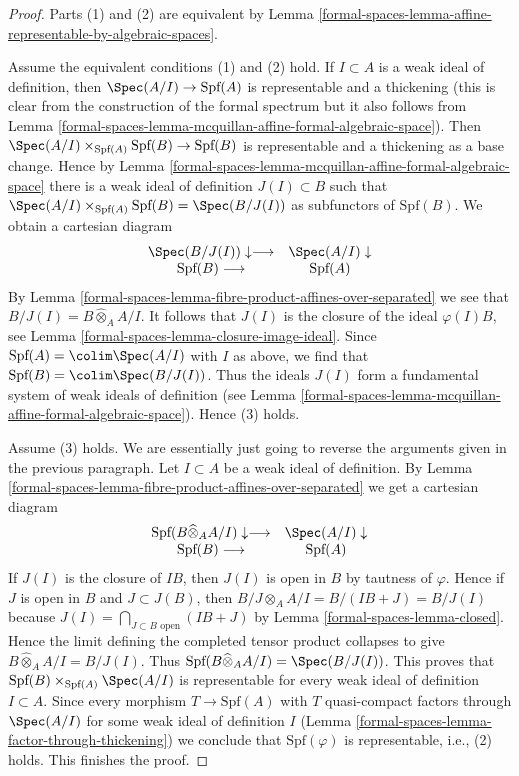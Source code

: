 \begin{proof}
Parts (1) and (2) are equivalent by
Lemma \ref{formal-spaces-lemma-affine-representable-by-algebraic-spaces}.

\medskip\noindent
Assume the equivalent conditions (1) and (2) hold.
If $I \subset A$ is a weak ideal of definition, then
$\Spec(A/I) \to \text{Spf}(A)$ is representable and a thickening
(this is clear from the construction of the formal spectrum
but it also follows from
Lemma \ref{formal-spaces-lemma-mcquillan-affine-formal-algebraic-space}).
Then $\Spec(A/I) \times_{\text{Spf}(A)} \text{Spf}(B) \to \text{Spf}(B)$
is representable and a thickening as a base change.
Hence by
Lemma \ref{formal-spaces-lemma-mcquillan-affine-formal-algebraic-space}
there is a weak ideal of definition $J(I) \subset B$ such that
$\Spec(A/I) \times_{\text{Spf}(A)} \text{Spf}(B) = \Spec(B/J(I))$
as subfunctors of $\text{Spf}(B)$. We obtain a cartesian diagram
$$
\begin{array}{cc}\Spec(B/J(I)) \downarrow\longrightarrow & \Spec(A/I) \downarrow \\ \text{Spf}(B) \longrightarrow & \text{Spf}(A)\end{array}
$$
By Lemma \ref{formal-spaces-lemma-fibre-product-affines-over-separated}
we see that $B/J(I) = B \widehat{\otimes}_A A/I$.
It follows that $J(I)$ is the closure of the ideal $\varphi(I)B$, see
Lemma \ref{formal-spaces-lemma-closure-image-ideal}.
Since $\text{Spf}(A) = \colim \Spec(A/I)$ with $I$ as above,
we find that $\text{Spf}(B) = \colim \Spec(B/J(I))$.
Thus the ideals $J(I)$ form a fundamental system of weak
ideals of definition (see
Lemma \ref{formal-spaces-lemma-mcquillan-affine-formal-algebraic-space}).
Hence (3) holds.

\medskip\noindent
Assume (3) holds. We are essentially just going to reverse the
arguments given in the previous paragraph.
Let $I \subset A$ be a weak ideal of definition.
By Lemma \ref{formal-spaces-lemma-fibre-product-affines-over-separated}
we get a cartesian diagram
$$
\begin{array}{cc}\text{Spf}(B \widehat{\otimes}_A A/I) \downarrow\longrightarrow & \Spec(A/I) \downarrow \\ \text{Spf}(B) \longrightarrow & \text{Spf}(A)\end{array}
$$
If $J(I)$ is the closure of $IB$, then $J(I)$ is open in $B$
by tautness of $\varphi$. Hence if $J$ is open in $B$ and $J \subset J(B)$,
then $B/J \otimes_A A/I = B/(IB + J) = B/J(I)$ because
$J(I) = \bigcap_{J \subset B\text{ open}} (IB + J)$ by Lemma \ref{formal-spaces-lemma-closed}.
Hence the limit defining the completed tensor product collapses to give
$B \widehat{\otimes}_A A/I = B/J(I)$.
Thus $\text{Spf}(B \widehat{\otimes}_A A/I) = \Spec(B/J(I))$.
This proves that $\text{Spf}(B) \times_{\text{Spf}(A)} \Spec(A/I)$
is representable for every weak ideal of definition $I \subset A$.
Since every morphism $T \to \text{Spf}(A)$ with $T$ quasi-compact
factors through $\Spec(A/I)$ for some weak ideal of definition $I$
(Lemma \ref{formal-spaces-lemma-factor-through-thickening})
we conclude that $\text{Spf}(\varphi)$ is representable, i.e.,
(2) holds. This finishes the proof.
\end{proof}

